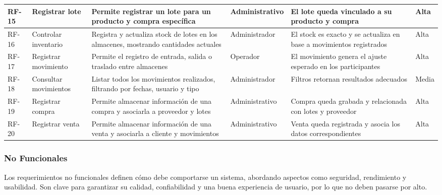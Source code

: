 \documentclass[12pt]{article} %
\begin{document}
  \begin{adjustbox}{width=\linewidth}
    \begin{tabularx}{\linewidth}{|>{\centering\arraybackslash}p{1cm}|
      >{\centering\arraybackslash}p{1.3cm}|
      >{\centering\arraybackslash}p{4.3cm}|
      >{\centering\arraybackslash}p{2.2cm}|
      >{\centering\arraybackslash}p{3.5cm}|
      >{\centering\arraybackslash}p{1.55cm}|}
\hline
      RF-15 & Registrar lote & Permite registrar un lote para un producto y compra específica & Administrativo & El lote queda vinculado a su producto y compra & Alta \\
      \hline
      RF-16 & Controlar inventario & Registra y actualiza stock de lotes en los almacenes, mostrando cantidades actuales & Administrador & El stock es exacto y se actualiza en base a movimientos registrados & Alta \\
      \hline
      RF-17 & Registrar movimiento & Permite el registro de entrada, salida o traslado entre almacenes & Operador & El movimiento genera el ajuste esperado en los participantes & Alta \\
      \hline
      RF-18 & Consultar movimientos & Listar todos los movimientos realizados, filtrando por fechas, usuario y tipo & Administrador & Filtros retornan resultados adecuados & Media \\
      \hline
      RF-19 & Registrar compra & Permite almacenar información de una compra y asociarla a proveedor y lotes & Administrativo & Compra queda grabada y relacionada con lotes y proveedor & Alta \\
      \hline
      RF-20 & Registrar venta & Permite almacenar información de una venta y asociarla a cliente y movimientos & Administrativo & Venta queda registrada y asocia los datos correspondientes & Alta \\
      \hline
    \end{tabularx}
  \end{adjustbox}
  \normalsize

\subsubsection*{No Funcionales}

Los requerimientos no funcionales definen cómo debe comportarse un sistema, abordando aspectos como seguridad, rendimiento y usabilidad. Son clave para garantizar su calidad, confiabilidad y una buena experiencia de usuario, por lo que no deben pasarse por alto.
\end{document}
